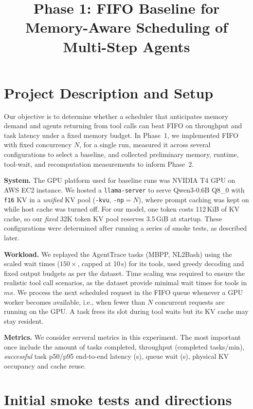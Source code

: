 \documentclass[10pt,twocolumn,letterpaper]{article}
\title{\vspace{-1.6em}\large\textbf{Phase 1: FIFO Baseline for Memory-Aware Scheduling of Multi-Step Agents}\vspace{-1.8em}}
\author{}
\date{}
\newcommand{\dec}[1]{\par\noindent\textit{Decision:} #1\par}
\begin{document}
\maketitle

\section{Project Description and Setup}
Our objective is to determine whether a scheduler that anticipates memory demand and agents returning from tool calls can beat FIFO on throughput and task latency under a fixed memory budget. In Phase~1, we implemented FIFO with fixed concurrency $N$, for a single run, measured it across several configurations to select a baseline, and collected preliminary memory, runtime, tool-wait, and recomputation measurements to inform Phase~2.

\textbf{System.} The GPU platform used for baseline runs was NVIDIA T4 GPU on AWS EC2 instance.
We hosted a \texttt{llama-server} to serve Qwen3-0.6B Q8\_0 with \texttt{f16} KV in a \emph{unified} KV pool (\texttt{-kvu}, \texttt{-np}$=N$), where prompt caching was kept on while host cache was turned off. For our model, one token costs 112\,KiB of KV cache, so our \textit{fixed} 32K token KV pool reserves 3.5\,GiB at startup. These configurations were determined after running a series of smoke tests, as described later.

\textbf{Workload.} We replayed the AgentTrace tasks (MBPP, NL2Bash) using the scaled wait times ($150\times$, capped at 10\,s) for its tools, used greedy decoding and fixed output budgets as per the dataset. Time scaling was required to ensure the realistic tool call scenarios, as the dataset provide minimal wait times for tools in $ms$. We process the next scheduled request in the FIFO queue whenever a GPU worker becomes available, i.e., when fewer than $N$ concurrent requests are running on the GPU. A task frees its slot during tool waits but its KV cache may stay resident.

\textbf{Metrics.} We consider serveral metrics in this experiment. The most important once include the amount of tasks completed, throughput (completed tasks/min), \textit{successful} task p50/p95 end-to-end latency (s), queue wait (s), physical KV occupancy and cache reuse.

\section{Initial smoke tests and directions}
\end{document}
